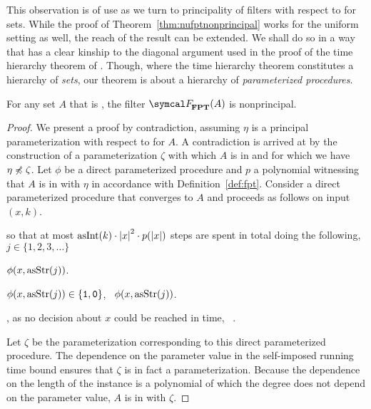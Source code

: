 %
This observation is of use as we turn to principality of filters with respect to  for  sets.
While the proof of Theorem~\ref{thm:nufptnonprincipal} works for the uniform setting as well, the reach of the result can be extended.
We shall do so in a way that has a clear kinship to the diagonal argument used in the proof of the time hierarchy theorem of \textcite{hartmanis1965computational}.
Though, where the time hierarchy theorem constitutes a hierarchy of \emph{sets}, our theorem is about a hierarchy of \emph{parameterized procedures}.
\begin{theorem}
\label{thm:fptnonprincipal}%
  For any set $A$ that is , the filter $\calF_\cl{FPT}(A)$ is nonprincipal.
\end{theorem}
\begin{proof}
  We present a proof by contradiction, assuming $\eta$ is a principal parameterization with respect to  for $A$.
  A contradiction is arrived at by the construction of a parameterization $\zeta$ with which $A$ is in  and for which we have $\eta \not\preccurlyeq \zeta$.
  Let $\phi$ be a direct parameterized procedure and $p$ a polynomial witnessing that $A$ is in  with $\eta$ in accordance with Definition~\ref{def:fpt}.
  Consider a direct parameterized procedure that converges to $A$ and proceeds as follows on input $(x, k)$.
  \begin{codelisting}
  \item
     so that at most $\asNat(k) \cdot \length{x}^2 \cdot p(\length{x})$ steps are spent in total doing the following,  $j \in \{1, 2, 3, \ldots\}$
    \begin{codelisting}
    \item
       $\phi(x, \asStr(j))$.
    \item
       $\phi(x, \asStr(j)) \in \{\bits{1}, \bits{0}\}$, ~$\phi(x, \asStr(j))$.
    \end{codelisting}
  \item
    , as no decision about $x$ could be reached in time, ~.
  \end{codelisting}

  Let $\zeta$ be the parameterization corresponding to this direct parameterized procedure.
  The dependence on the parameter value in the self-imposed running time bound ensures that $\zeta$ is in fact a parameterization.
  Because the dependence on the length of the instance is a polynomial of which the degree does not depend on the parameter value, $A$ is in  with $\zeta$.


\end{proof}
